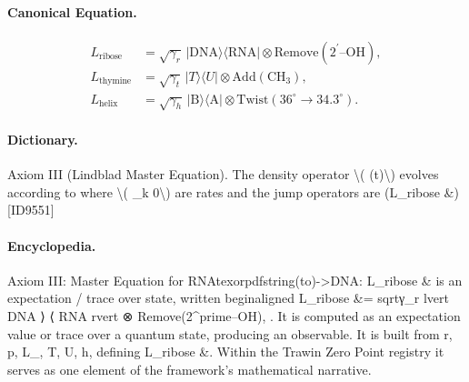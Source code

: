\paragraph{Canonical Equation.}
\[
\begin{aligned} L_{\mathrm{ribose}} &= \sqrt{\gamma_{r}}\, \lvert \mathrm{DNA} \rangle \langle \mathrm{RNA} \rvert \otimes \mathrm{Remove}(2^{\prime}\text{--OH}), \\[4pt] L_{\mathrm{thymine}} &= \sqrt{\gamma_{t}}\, \lvert T \rangle \langle U \rvert \otimes \mathrm{Add}(\mathrm{CH}_{3}), \\[4pt] L_{\mathrm{helix}} &= \sqrt{\gamma_{h}}\, \lvert \mathrm{B} \rangle \langle \mathrm{A} \rvert \otimes \mathrm{Twist}(36^{\circ} \to 34.3^{\circ}) . \end{aligned}
\]

\paragraph{Dictionary.}
Axiom III (Lindblad Master Equation). The density operator \textbackslash{}( (t)\textbackslash{}) evolves according to where \textbackslash{}( \_k 0\textbackslash{}) are rates and the jump operators are (L\_ribose \&) [ID9551]

\paragraph{Encyclopedia.}
Axiom III: Master Equation for RNAtexorpdfstring(to)->DNA: L\_ribose \& is an expectation / trace over state, written beginaligned L\_ribose \&= sqrtγ\_r lvert DNA ⟩ ⟨ RNA rvert ⊗ Remove(2\textasciicircum{}prime--OH), . It is computed as an expectation value or trace over a quantum state, producing an observable. It is built from r, p, L\_, T, U, h, defining L\_ribose \&. Within the Trawin Zero Point registry it serves as one element of the framework's mathematical narrative.

